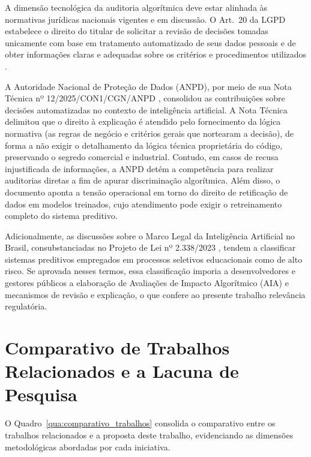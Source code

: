 A dimensão tecnológica da auditoria algorítmica deve estar alinhada às normativas jurídicas nacionais vigentes e em discussão. O Art.~20 da LGPD estabelece o direito do titular de solicitar a revisão de decisões tomadas unicamente com base em tratamento automatizado de seus dados pessoais e de obter informações claras e adequadas sobre os critérios e procedimentos utilizados \cite{brasil2018lgpd}.

A Autoridade Nacional de Proteção de Dados (ANPD), por meio de sua Nota Técnica nº 12/2025/CON1/CGN/ANPD \cite{anpd2025nota12}, consolidou as contribuições sobre decisões automatizadas no contexto de inteligência artificial. A Nota Técnica delimitou que o direito à explicação é atendido pelo fornecimento da lógica normativa (as regras de negócio e critérios gerais que nortearam a decisão), de forma a não exigir o detalhamento da lógica técnica proprietária do código, preservando o segredo comercial e industrial. Contudo, em casos de recusa injustificada de informações, a ANPD detém a competência para realizar auditorias diretas a fim de apurar discriminação algorítmica. Além disso, o documento aponta a tensão operacional em torno do direito de retificação de dados em modelos treinados, cujo atendimento pode exigir o retreinamento completo do sistema preditivo.

Adicionalmente, as discussões sobre o Marco Legal da Inteligência Artificial no Brasil, consubstanciadas no Projeto de Lei nº 2.338/2023 \cite{brasil2023pl2338}, tendem a classificar sistemas preditivos empregados em processos seletivos educacionais como de alto risco. Se aprovada nesses termos, essa classificação imporia a desenvolvedores e gestores públicos a elaboração de Avaliações de Impacto Algorítmico (AIA) e mecanismos de revisão e explicação, o que confere ao presente trabalho relevância regulatória.

\section{Comparativo de Trabalhos Relacionados e a Lacuna de Pesquisa}
\label{sec:comparativo_trabalhos}

O Quadro~\ref{qua:comparativo_trabalhos} consolida o comparativo entre os trabalhos relacionados e a proposta deste trabalho, evidenciando as dimensões metodológicas abordadas por cada iniciativa.

